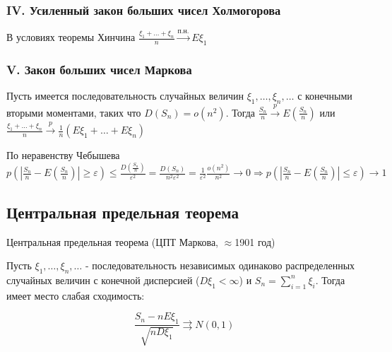 \documentclass[12pt]{article}
\begin{document}
    \subsubsection{IV. Усиленный закон больших чисел Холмогорова}

    В условиях теоремы Хинчина $\frac{\xi_1 + \dots + \xi_n}{n} \overset{\text{п.н.}}{\longrightarrow} E\xi_1$

    \subsubsection{V. Закон больших чисел Маркова}

    \begin{MyTheorem}
        \Ths Пусть имеется последовательность случайных величин $\xi_1, \dots, \xi_n, \dots$ с конечными вторыми моментами, таких 
        что $D(S_n) = o(n^2)$. Тогда $\frac{S_n}{n} \overset{p}{\longrightarrow} E\left(\frac{S_n}{n}\right)$ или $\frac{\xi_1 + \dots + \xi_n}{n} \overset{p}{\longrightarrow} \frac{1}{n} (E\xi_1 + \dots + E\xi_n)$
    \end{MyTheorem}

    \begin{MyProof}
        По неравенству Чебышева $p\left(\left|\frac{S_n}{n} - E\left(\frac{S_n}{n}\right)\right| \geq \varepsilon\right) \leq \frac{D\left(\frac{S_n}{n}\right)}{\varepsilon^2} = \frac{D(S_n)}{n^2 \varepsilon^2} =
        \frac{1}{\varepsilon^2} \frac{o(n^2)}{n^2} \longrightarrow 0 \Longrightarrow p\left(\left|\frac{S_n}{n} - E\left(\frac{S_n}{n}\right)\right| \leq \varepsilon\right) \longrightarrow 1$
    \end{MyProof}

    \subsection{Центральная предельная теорема}

    \begin{MyTheorem}
        \Ths Центральная предельная теорема (ЦПТ Маркова, $\approx$1901 год)

        Пусть $\xi_1, \dots, \xi_n, \dots$ - последовательность независимых одинаково распределенных случайных величин
        с конечной дисперсией ($D\xi_1 < \infty$) и $S_n = \sum_{i = 1}^n \xi_i$. Тогда имеет место слабая сходимость:

        \[\frac{S_n - nE\xi_1}{\sqrt{nD\xi_1}} \rightrightarrows N(0, 1)\]
    \end{MyTheorem}
\end{document}

